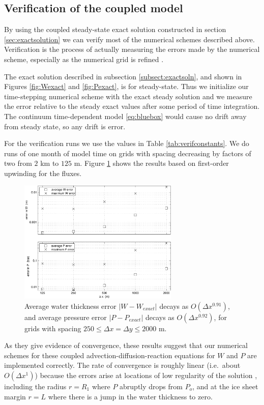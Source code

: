 \documentclass[gmd]{copernicus}   %
\begin{document}
\subsection{Verification of the coupled model}  By using the coupled steady-state exact solution constructed in section \ref{sec:exactsolution} we can verify most of the numerical schemes described above.  Verification is the process of actually measuring the errors made by the numerical scheme, especially as the numerical grid is refined \citep{BLKCB,Wesseling}.

The exact solution described in subsection \ref{subsect:exactsoln}, and shown in Figures \ref{fig:Wexact} and \ref{fig:Pexact}, is for steady-state.  Thus we initialize our time-stepping numerical scheme with the exact steady solution and we measure the error relative to the steady exact values after some period of time integration.  The continuum time-dependent model \eqref{eq:bluebox} would cause no drift away from steady state, so any drift is error.

For the verification runs we use the values in Table \ref{tab:verifconstants}.  We do runs of one month of model time on grids with spacing decreasing by factors of two from $2$ km to $125$ m.  Figure \ref{fig:refineWPpism} shows the results based on first-order upwinding for the fluxes.

\begin{figure}[ht]
\includegraphics[width=3.0in,keepaspectratio=true]{refineWPpism}
\caption{Average water thickness error $|W-W_{exact}|$ decays as $O(\Delta x^{0.91})$, and average pressure error $|P-P_{exact}|$ decays as $O(\Delta x^{0.92})$, for grids with spacing $250 \le \Delta x = \Delta y \le 2000$ m.}
\label{fig:refineWPpism}
\end{figure}

As they give evidence of convergence, these results suggest that our numerical schemes for these coupled advection-diffusion-reaction equations for $W$ and $P$ are implemented correctly.  The rate of convergence is roughly linear (i.e.~about $O(\Delta x^1)$) because the errors arise at locations of low regularity of the solution \citep{BLKCB}, including the radius $r=R_1$ where $P$ abruptly drops from $P_o$, and at the ice sheet margin $r=L$ where there is a jump in the water thickness to zero.
\end{document}
